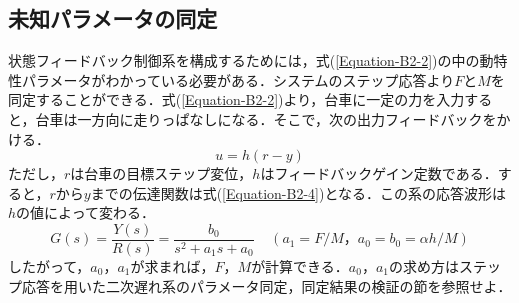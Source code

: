 \documentclass[12pt]{jsarticle}
\begin{document}
\subsection{未知パラメータの同定}
状態フィードバック制御系を構成するためには，式(\ref{Equation-B2-2})の中の動特性パラメータがわかっている必要がある．システムのステップ応答より$F$と$M$を同定することができる．式(\ref{Equation-B2-2})より，台車に一定の力を入力すると，台車は一方向に走りっぱなしになる．そこで，次の出力フィードバックをかける．
\begin{equation}
  \label{Equation-B2-3}
  u = h(r - y)
\end{equation}
ただし，$r$は台車の目標ステップ変位，$h$はフィードバックゲイン定数である．すると，$r$から$y$までの伝達関数は式(\ref{Equation-B2-4})となる．この系の応答波形は$h$の値によって変わる．
\begin{equation}
  \label{Equation-B2-4}
  G(s) = \frac{Y(s)}{R(s)} = \frac{b_0}{s^2+a_1s+a_0}\;\;\;\;(a_1 =F/M，a_0=b_0=\alpha h /M)
\end{equation}
したがって，$a_0$，$a_1$が求まれば，$F$，$M$が計算できる．$a_0$，$a_1$の求め方はステップ応答を用いた二次遅れ系のパラメータ同定，同定結果の検証の節を参照せよ．
\end{document}
